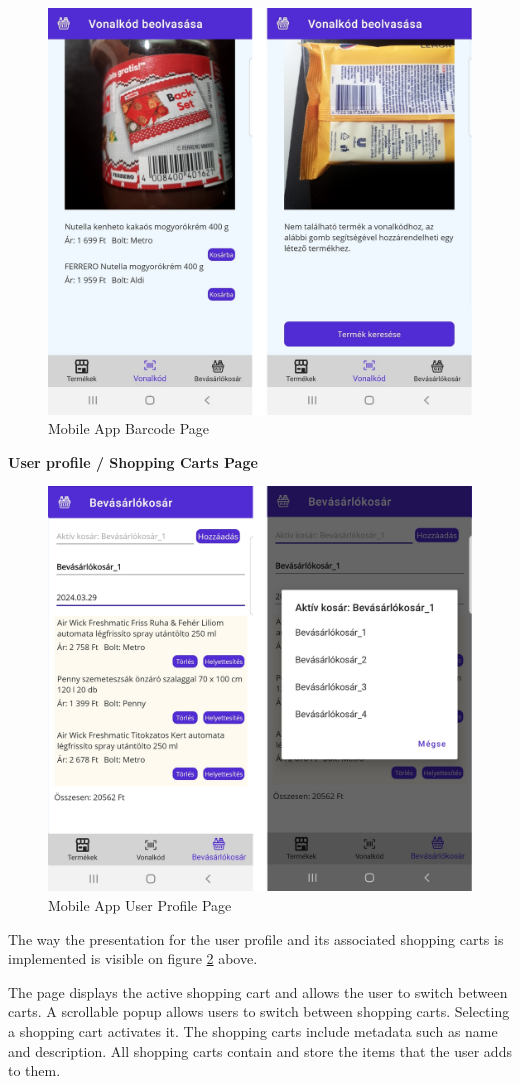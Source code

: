 \begin{figure}[H]
	\centering
	\includegraphics[width=0.6\linewidth]{img/app_barcodepage.png}
	\caption{Mobile App Barcode Page}
	\label{fig:appbarcodepage}
\end{figure}

\noindent\textbf{User profile / Shopping Carts Page}

\begin{figure}[H]
	\centering
	\includegraphics[width=0.6\linewidth]{img/app_shoppingcartpage.png}
	\caption{Mobile App User Profile Page}
	\label{fig:appshoppingcartspage}
\end{figure}

The way the presentation for the user profile and its associated shopping carts is implemented is visible on figure \ref{fig:appshoppingcartspage} above.

The page displays the active shopping cart and allows the user to switch between carts.  A scrollable popup allows users to switch between shopping carts. Selecting a shopping cart activates it. The shopping carts include metadata such as name and description. All shopping carts contain and store the items that the user adds to them. 

